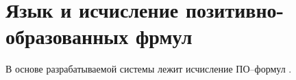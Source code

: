 











\section{Язык и исчисление позитивно-образованных фрмул}

В основе разрабатываемой системы лежит исчисление ПО--формул \cite{ICDS2000, DavydovX}.

